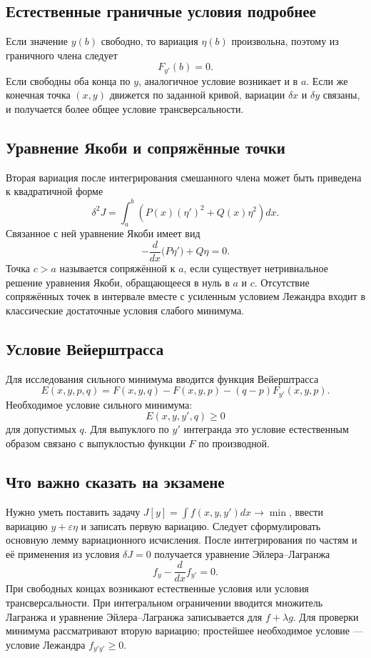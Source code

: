 \subsection{Естественные граничные условия подробнее}

Если значение $y(b)$ свободно, то вариация $\eta(b)$ произвольна, поэтому из
граничного члена следует
\[
    F_{y'}(b)=0.
\]
Если свободны оба конца по $y$, аналогичное условие возникает и в $a$.
Если же конечная точка $(x,y)$ движется по заданной кривой, вариации $\delta x$ и
$\delta y$ связаны, и получается более общее условие трансверсальности.

\subsection{Уравнение Якоби и сопряжённые точки}

Вторая вариация после интегрирования смешанного члена может быть приведена к
квадратичной форме
\[
\delta^2J=\int_a^b\left(P(x)(\eta')^2+Q(x)\eta^2\right)dx.
\]
Связанное с ней уравнение Якоби имеет вид
\[
    -\frac d{dx}\bigl(P\eta'\bigr)+Q\eta=0.
\]
Точка $c>a$ называется сопряжённой к $a$, если существует нетривиальное решение
уравнения Якоби, обращающееся в нуль в $a$ и $c$. Отсутствие сопряжённых точек в
интервале вместе с усиленным условием Лежандра входит в классические достаточные
условия слабого минимума.

\subsection{Условие Вейерштрасса}

Для исследования сильного минимума вводится функция Вейерштрасса
\[
E(x,y,p,q)=F(x,y,q)-F(x,y,p)-(q-p)F_{y'}(x,y,p).
\]
Необходимое условие сильного минимума:
\[
    E(x,y,y',q)\ge0
\]
для допустимых $q$. Для выпуклого по $y'$ интегранда это условие естественным образом
связано с выпуклостью функции $F$ по производной.

\subsection{Что важно сказать на экзамене}

Нужно уметь поставить задачу
$J[y]=\int f(x,y,y')dx\to\min$, ввести вариацию
$y+\varepsilon\eta$ и записать первую вариацию. Следует сформулировать
основную лемму вариационного исчисления. После интегрирования по частям и её
применения из условия $\delta J=0$ получается уравнение Эйлера--Лагранжа
\[
    f_y-\frac{d}{dx}f_{y'}=0.
\]
При свободных концах возникают естественные условия или условия
трансверсальности. При интегральном ограничении вводится множитель Лагранжа и
уравнение Эйлера--Лагранжа записывается для $f+\lambda g$. Для проверки
минимума рассматривают вторую вариацию; простейшее необходимое условие ---
условие Лежандра $f_{y'y'}\geq0$.

\newpage
